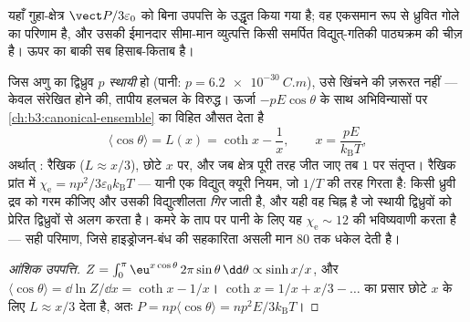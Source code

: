 \begin{remark}
यहाँ गुहा-क्षेत्र $\vect P/3\varepsilon_0$ को बिना उपपत्ति के उद्धृत
किया गया है; वह एकसमान रूप से ध्रुवित गोले का परिणाम है, और उसकी
ईमानदार सीमा-मान व्युत्पत्ति किसी समर्पित विद्युत्-गतिकी पाठ्यक्रम की
चीज़ है। ऊपर का बाकी सब हिसाब-किताब है।
\end{remark}

\begin{proposition}[ध्रुवी अणु: लांजवें फलन]\label{prop:b3:electromagnetism-in-matter:langevin}
जिस अणु का द्विध्रुव $p$ \emph{स्थायी} हो (पानी:
$p = \qty{6.2e-30}{C.m}$), उसे खिंचने की ज़रूरत नहीं --- केवल संरेखित
होने की, तापीय हलचल के विरुद्ध। ऊर्जा
$-pE\cos\theta$ के साथ अभिविन्यासों पर
\cref{ch:b3:canonical-ensemble} का विहित औसत देता है
\[
\langle\cos\theta\rangle = L(x) = \coth x - \frac1x ,
\qquad x = \frac{pE}{k_{\text{B}}T} ,
\]
अर्थात् \emph{}: रैखिक ($L \approx x/3$), छोटे $x$ पर,
और जब क्षेत्र पूरी तरह जीत जाए तब $1$ पर संतृप्त। रैखिक प्रांत में
$\chi_{\text{e}} = np^2/3\varepsilon_0k_{\text{B}}T$ --- यानी एक
विद्युत् क्यूरी नियम, जो $1/T$ की तरह गिरता है: किसी ध्रुवी द्रव को
गरम कीजिए और उसकी विद्युत्शीलता \emph{गिर} जाती है, और यही वह चिह्न
है जो स्थायी द्विध्रुवों को प्रेरित द्विध्रुवों से अलग करता है। कमरे
के ताप पर पानी के लिए यह $\chi_{\text{e}} \sim 12$ की भविष्यवाणी करता
है --- सही परिमाण, जिसे हाइड्रोजन-बंध की सहकारिता असली मान
$80$ तक धकेल देती है।
\end{proposition}

\begin{proof}[आंशिक उपपत्ति]
$Z = \int_0^\pi \eu^{x\cos\theta}\,2\pi\sin\theta\,\dd\theta \propto
\sinh x/x$, और $\langle\cos\theta\rangle = \dd\ln Z/\dd x = \coth x
- 1/x$। $\coth x = 1/x + x/3 - \dots$ का प्रसार छोटे $x$ के लिए
$L \approx x/3$ देता है, अतः $P = np\langle\cos\theta\rangle =
np^2E/3k_{\text{B}}T$।
\end{proof}

